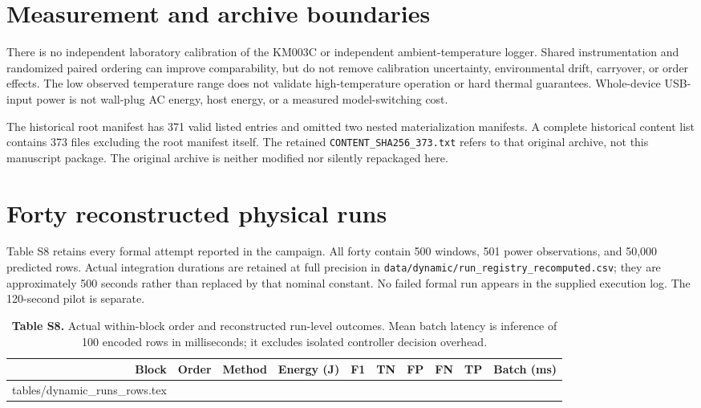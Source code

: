 \documentclass[10pt,a4paper]{article}
\makeatletter
\renewcommand{\arraystretch}{1.12}
\newcommand{\tableinput}[1]{\@@input #1.tex }
\makeatother
\begin{document}
\section{Measurement and archive boundaries}
There is no independent laboratory calibration of the KM003C or independent ambient-temperature logger. Shared instrumentation and randomized paired ordering can improve comparability, but do not remove calibration uncertainty, environmental drift, carryover, or order effects. The low observed temperature range does not validate high-temperature operation or hard thermal guarantees. Whole-device USB-input power is not wall-plug AC energy, host energy, or a measured model-switching cost.

The historical root manifest has 371 valid listed entries and omitted two nested materialization manifests. A complete historical content list contains 373 files excluding the root manifest itself. The retained \texttt{CONTENT\_SHA256\_373.txt} refers to that original archive, not this manuscript package. The original archive is neither modified nor silently repackaged here.

\clearpage
\section{Forty reconstructed physical runs}
Table S8 retains every formal attempt reported in the campaign. All forty contain 500 windows, 501 power observations, and 50,000 predicted rows. Actual integration durations are retained at full precision in \texttt{data/dynamic/run\_registry\_recomputed.csv}; they are approximately 500 seconds rather than replaced by that nominal constant. No failed formal run appears in the supplied execution log. The 120-second pilot is separate.

\begin{table}[h!]
\centering\small
\caption*{\textbf{Table S8.} Actual within-block order and reconstructed run-level outcomes. Mean batch latency is inference of 100 encoded rows in milliseconds; it excludes isolated controller decision overhead.}
\setlength{\tabcolsep}{3.2pt}\renewcommand{\arraystretch}{1.06}
\begin{tabular}{rrlrrrrrrr}\toprule
Block & Order & Method & Energy (J) & F1 & TN & FP & FN & TP & Batch (ms)\\\midrule
\tableinput{tables/dynamic_runs_rows}
\bottomrule\end{tabular}
\end{table}
\end{document}
